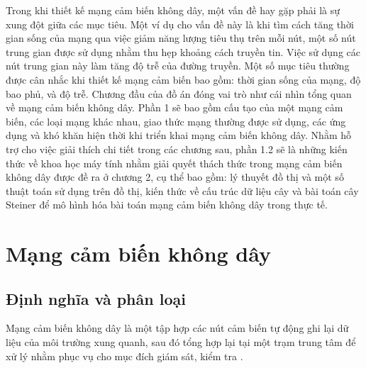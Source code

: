 \documentclass{hust}
\begin{document}
Trong khi thiết kế mạng cảm biến không dây, một vấn đề hay gặp phải là sự xung đột giữa các mục tiêu. Một ví dụ cho vấn đề này là khi tìm cách tăng thời gian sống của mạng qua việc giảm năng lượng tiêu thụ trên mỗi nút, một số nút trung gian được sử dụng nhằm thu hẹp khoảng cách truyền tin. Việc sử dụng các nút trung gian này làm tăng độ trễ của đường truyền. Một số mục tiêu thường được cân nhắc khi thiết kế mạng cảm biến bao gồm: thời gian sống của mạng, độ bao phủ, và độ trễ.
Chương đầu của đồ án đóng vai trò như cái nhìn tổng quan về mạng cảm biến không dây. Phần 1 sẽ bao gồm cấu tạo của một mạng cảm biến, các loại mạng khác nhau, giao thức mạng thường được sử dụng, các ứng dụng và khó khăn hiện thời khi triển khai mạng cảm biến không dây. Nhằm hỗ trợ cho việc giải thích chi tiết trong các chương sau, phần 1.2 sẽ là những kiến thức về khoa học máy tính nhằm giải quyết thách thức trong mạng cảm biến không dây được đề ra ở chương 2, cụ thể bao gồm: lý thuyết đồ thị và một số thuật toán sử dụng trên đồ thị, kiến thức về cấu trúc dữ liệu cây và bài toán cây Steiner để mô hình hóa bài toán mạng cảm biến không dây trong thực tế.

\section{Mạng cảm biến không dây}
\subsection{Định nghĩa và phân loại}
Mạng cảm biến không dây là một tập hợp các nút cảm biến tự động ghi lại dữ liệu của môi trường xung quanh, sau đó tổng hợp lại tại một trạm trung tâm để xử lý nhằm phục vụ cho mục đích giám sát, kiểm tra \cite{koviwireless}.
\end{document}

